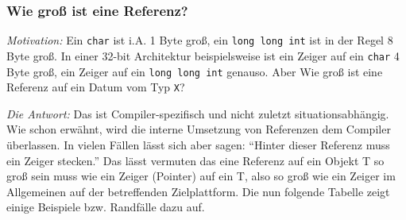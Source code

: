 \documentclass[a4paper]{report}
\begin{document}
\subsubsection{Wie groß ist eine Referenz?}

\textit{Motivation:} \quad Ein \texttt{char} ist i.A. 1 Byte groß, ein \texttt{long long int} ist in der Regel 8 Byte groß. In einer 32-bit Architektur beispielsweise ist ein Zeiger auf ein \texttt{char} 4 Byte groß, ein Zeiger auf ein \texttt{long long int} genauso. Aber Wie groß ist eine Referenz auf ein Datum vom Typ \texttt{X}? 
\medskip

\noindent
\textit{Die Antwort:} \quad Das ist Compiler-spezifisch und nicht zuletzt situationsabhängig. Wie schon erwähnt, wird die interne Umsetzung von Referenzen dem Compiler überlassen. In vielen Fällen lässt sich aber sagen: "`Hinter dieser Referenz muss ein Zeiger stecken."' Das lässt vermuten das eine Referenz auf ein Objekt T so groß sein muss wie ein Zeiger (Pointer) auf ein T, also so groß wie ein Zeiger im Allgemeinen auf der betreffenden Zielplattform. Die nun folgende Tabelle zeigt einige Beispiele bzw. Randfälle dazu auf.
\def\cout{{<}{<}}
\end{document}

